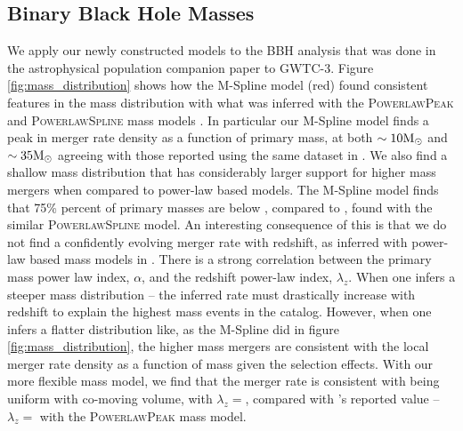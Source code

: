 \subsection{Binary Black Hole Masses} \label{sec:mass_dist}

We apply our newly constructed models to the BBH analysis that was done in the astrophysical population companion paper to GWTC-3. 
Figure \ref{fig:mass_distribution} shows how the M-Spline model (red) found consistent features in the mass distribution with 
what was inferred with the \textsc{PowerlawPeak} and \textsc{PowerlawSpline} mass models \citep{Talbot_2018,o3a_pop,Edelman_2022ApJ,o3b_astro_dist}. 
In particular our M-Spline model finds a peak in merger rate density as a function of primary mass, at both $\sim10{\rm M}_\odot$ and $\sim35{\rm M}_\odot$ agreeing with those 
reported using the same dataset in \citet{o3b_astro_dist}. We also find a shallow mass distribution that has considerably larger support for higher mass mergers when 
compared to power-law based models. The M-Spline model finds that 75\% percent of primary masses are below \result{$\CIPlusMinus{\macros[MassDistribution][MSpline][m_75percentile]}$}, 
compared to \result{$\CIPlusMinus{\macros[MassDistribution][PLSpline][m_75percentile]}$}, found with the similar \textsc{PowerlawSpline} model. 
An interesting consequence of this is that we do not find a confidently evolving merger rate with redshift, as inferred with power-law based mass models in \citet{o3b_astro_dist}. 
There is a strong correlation between the primary mass power law index, $\alpha$, and the redshift power-law index, $\lambda_z$. When one infers a steeper mass distribution -- 
the inferred rate must drastically increase with redshift to explain the highest mass events in the catalog. However, when one infers a 
flatter distribution like, as the M-Spline did in figure \ref{fig:mass_distribution}, the higher mass mergers are consistent with 
the local merger rate density as a function of mass given the selection effects. With our more flexible mass model, we find that the merger rate 
is consistent with being uniform with co-moving volume, with $\lambda_z = $\result{$\CIPlusMinus{\macros[MSplineIIDCompSpins][lamb]}$}, compared with 
\citet{o3b_astro_dist}'s reported value -- $\lambda_z = $\result{$\CIPlusMinus{\macros[PLPeak][lamb]}$} with the \textsc{PowerlawPeak} mass model.


